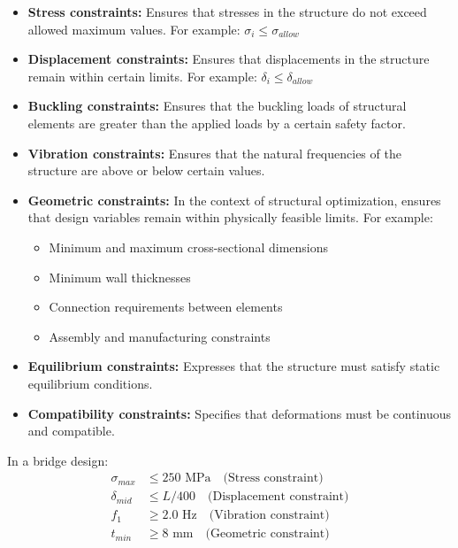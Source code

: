\begin{itemize}
    \item \textbf{Stress constraints:} Ensures that stresses in the structure do not exceed allowed maximum values. For example: $\sigma_i \leq \sigma_{allow}$
    
    \item \textbf{Displacement constraints:} Ensures that displacements in the structure remain within certain limits. For example: $\delta_i \leq \delta_{allow}$
    
    \item \textbf{Buckling constraints:} Ensures that the buckling loads of structural elements are greater than the applied loads by a certain safety factor.
    
    \item \textbf{Vibration constraints:} Ensures that the natural frequencies of the structure are above or below certain values.
    
    \item \textbf{Geometric constraints:} In the context of structural optimization, ensures that design variables remain within physically feasible limits. For example:
    \begin{itemize}
        \item Minimum and maximum cross-sectional dimensions
        \item Minimum wall thicknesses
        \item Connection requirements between elements
        \item Assembly and manufacturing constraints
    \end{itemize}
    
    \item \textbf{Equilibrium constraints:} Expresses that the structure must satisfy static equilibrium conditions.
    
    \item \textbf{Compatibility constraints:} Specifies that deformations must be continuous and compatible.
\end{itemize}

\begin{tcolorbox}[title=Example of Structural Optimization Constraints]
In a bridge design:
\begin{align}
\sigma_{max} &\leq 250 \text{ MPa} \quad \text{(Stress constraint)} \\
\delta_{mid} &\leq L/400 \quad \text{(Displacement constraint)} \\
f_1 &\geq 2.0 \text{ Hz} \quad \text{(Vibration constraint)} \\
t_{min} &\geq 8 \text{ mm} \quad \text{(Geometric constraint)}
\end{align}
\end{tcolorbox}

